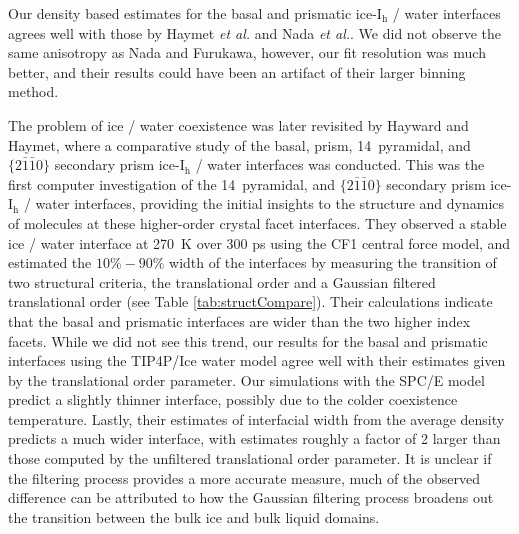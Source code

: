 Our density based estimates for the basal and prismatic
ice-I$_\mathrm{h}$ / water interfaces agrees well with those by Haymet
\textit{et al.} and Nada \textit{et al.}. We did not observe the same
anisotropy as Nada and Furukawa, however, our fit resolution was much
better, and their results could have been an artifact of their larger
binning method.

The problem of ice / water coexistence was later revisited by Hayward
and Haymet, where a comparative study of the basal, prism,
14\degree~pyramidal, and $\{2\bar{1}\bar{1}0\}$ secondary prism
ice-I$_\mathrm{h}$ / water interfaces was conducted.\cite{Hayward2001}
This was the first computer investigation of the 14\degree~pyramidal,
and $\{2\bar{1}\bar{1}0\}$ secondary prism ice-I$_\mathrm{h}$ / water
interfaces, providing the initial insights to the structure and
dynamics of molecules at these higher-order crystal facet interfaces.
They observed a stable ice / water interface at 270~K over 300 ps
using the CF1 central force model, and estimated the $10\%-90\%$ width
of the interfaces by measuring the transition of two structural
criteria, the translational order and a Gaussian filtered
translational order (see Table \ref{tab:structCompare}). Their
calculations indicate that the basal and prismatic interfaces are
wider than the two higher index facets. While we did not see this
trend, our results for the basal and prismatic interfaces using the
TIP4P/Ice water model agree well with their estimates given by the
translational order parameter. Our simulations with the SPC/E model
predict a slightly thinner interface, possibly due to the colder
coexistence temperature. Lastly, their estimates of interfacial width
from the average density predicts a much wider interface, with
estimates roughly a factor of 2 larger than those computed by the
unfiltered translational order parameter. It is unclear if the
filtering process provides a more accurate measure, much of the
observed difference can be attributed to how the Gaussian filtering
process broadens out the transition between the bulk ice and bulk
liquid domains.
 

